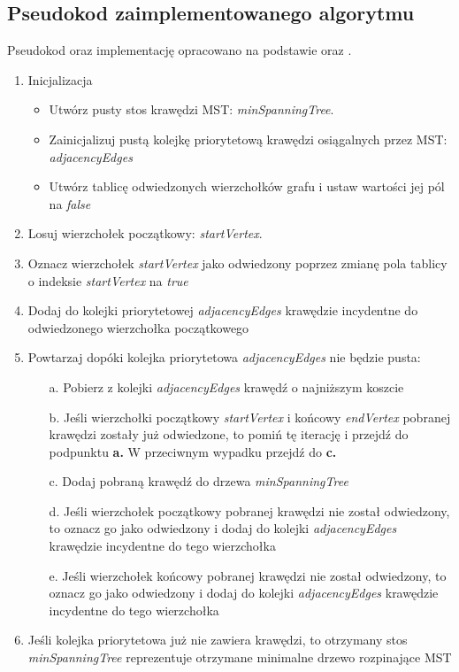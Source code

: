 \subsection{Pseudokod zaimplementowanego algorytmu}
Pseudokod oraz implementację opracowano na podstawie \cite{prim2} oraz \cite{prim}.
\begin{enumerate}
	\item Inicjalizacja
	\begin{itemize}
		\item Utwórz pusty stos krawędzi MST: \emph{minSpanningTree}.
		\item Zainicjalizuj pustą kolejkę priorytetową krawędzi osiągalnych przez MST:\\ \emph{adjacencyEdges}
		\item Utwórz tablicę odwiedzonych wierzchołków grafu i ustaw wartości jej pól na \emph{false}
	\end{itemize}
	
	\item Losuj wierzchołek początkowy: \emph{startVertex}.
	\item Oznacz wierzchołek \emph{startVertex} jako odwiedzony poprzez zmianę pola tablicy o indeksie \emph{startVertex} na \emph{true}
	\item Dodaj do kolejki priorytetowej \emph{adjacencyEdges} krawędzie incydentne do odwiedzonego wierzchołka początkowego
	
	\item Powtarzaj dopóki kolejka priorytetowa \emph{adjacencyEdges} nie będzie pusta:
	\begin{itemize}
		\item[a.] Pobierz z kolejki \emph{adjacencyEdges} krawędź o najniższym koszcie
		\item[b.] Jeśli wierzchołki początkowy \emph{startVertex} i końcowy \emph{endVertex} pobranej krawędzi zostały już odwiedzone, to pomiń tę iterację i przejdź do podpunktu \textbf{a.} W przeciwnym wypadku przejdź do \textbf{c.}
		\item[c.]  Dodaj pobraną krawędź do drzewa \emph{minSpanningTree}
		\item [d.] Jeśli wierzchołek początkowy pobranej krawędzi nie został odwiedzony, to oznacz go jako odwiedzony i dodaj do kolejki \emph{adjacencyEdges} krawędzie incydentne do tego wierzchołka
		\item [e.] Jeśli wierzchołek końcowy pobranej krawędzi nie został odwiedzony, to oznacz go jako odwiedzony  i dodaj do kolejki \emph{adjacencyEdges} krawędzie incydentne do tego wierzchołka
	\end{itemize}

\item Jeśli kolejka priorytetowa już nie zawiera krawędzi, to otrzymany stos  \emph{minSpanningTree} reprezentuje otrzymane minimalne drzewo rozpinające MST
\end{enumerate} 


